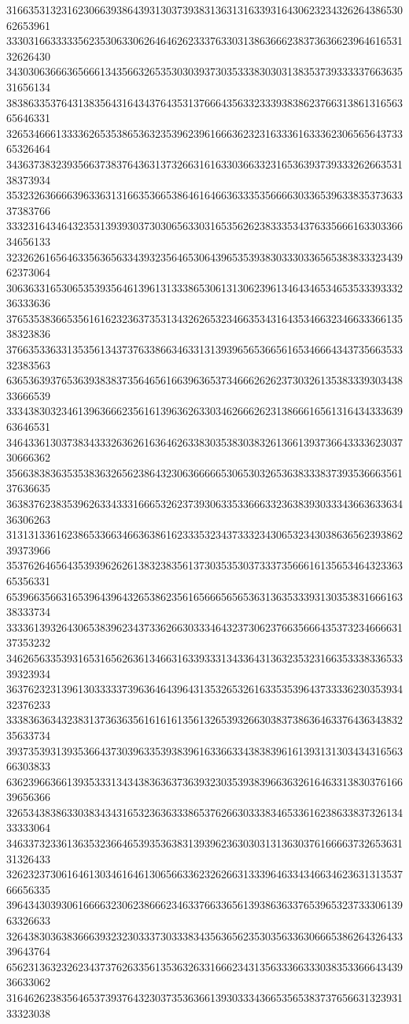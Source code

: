 31663531323162306639386439313037393831363131633931643062323432626438653062653961
33303166333335623530633062646462623337633031386366623837363662396461653132626430
34303063666365666134356632653530303937303533383030313835373933333766363531656134
38386335376431383564316434376435313766643563323339383862376631386131656365646331
32653466613333626535386536323539623961666362323163336163336230656564373365326464
34363738323935663738376436313732663161633036633231653639373933326266353138373934
35323263666639633631316635366538646164663633353566663033653963383537363337383766
33323164346432353139393037303065633031653562623833353437633566616330336634656133
32326261656463356365633439323564653064396535393830333033656538383332343962373064
30636331653065353935646139613133386530613130623961346434653465353339333236333636
37653538366535616162323637353134326265323466353431643534663234663336613538323836
37663533633135356134373763386634633131393965653665616534666434373566353332383563
63653639376536393838373564656166396365373466626262373032613538333930343833666539
33343830323461396366623561613963626330346266626231386661656131643433363963646531
34643361303738343332636261636462633830353830383261366139373664333362303730666362
35663838363535383632656238643230636666653065303265363833383739353666356137636635
36383762383539626334333166653262373930633533666332363839303334366363363436306263
31313133616238653366346636386162333532343733323430653234303863656239386239373966
35376264656435393962626138323835613730353530373337356661613565346432336365356331
65396635663165396439643265386235616566656565363136353339313035383166616338333734
33336139326430653839623437336266303334643237306237663566643537323466663137353232
34626563353931653165626361346631633933313433643136323532316635333833653339323934
36376232313961303333373963646439643135326532616335353964373333623035393432376233
33383636343238313736363561616161356132653932663038373863646337643634383235633734
39373539313935366437303963353938396163366334383839616139313130343431656366303833
63623966366139353331343438363637363932303539383966363261646331383037616639656366
32653438386330383434316532363633386537626630333834653361623863383732613433333064
34633732336136353236646539353638313939623630303131363037616666373265363131326433
32623237306164613034616461306566336232626631333964633434663462363131353766656335
39643430393061666632306238666234633766336561393863633765396532373330613963326633
32643830363836663932323033373033383435636562353035633630666538626432643339643764
65623136323262343737626335613536326331666234313563336633303835336664343936633062
31646262383564653739376432303735363661393033343665356538373765663132393133323038
